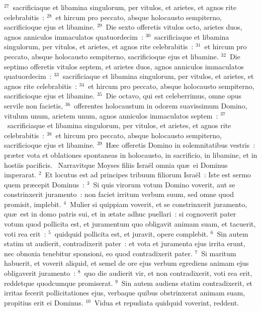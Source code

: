 ${}^{27}$~sacrificiaque et libamina singulorum, per vitulos, et arietes, et agnos rite celebrabitis~:
${}^{28}$~et hircum pro peccato, absque holocausto sempiterno, sacrificioque ejus et libamine.
${}^{29}$~Die sexto offeretis vitulos octo, arietes duos, agnos anniculos immaculatos quatuordecim~:
${}^{30}$~sacrificiaque et libamina singulorum, per vitulos, et arietes, et agnos rite celebrabitis~:
${}^{31}$~et hircum pro peccato, absque holocausto sempiterno, sacrificioque ejus et libamine.
${}^{32}$~Die septimo offeretis vitulos septem, et arietes duos, agnos anniculos immaculatos quatuordecim~:
${}^{33}$~sacrificiaque et libamina singulorum, per vitulos, et arietes, et agnos rite celebrabitis~:
${}^{34}$~et hircum pro peccato, absque holocausto sempiterno, sacrificioque ejus et libamine.
${}^{35}$~Die octavo, qui est celeberrimus, omne opus servile non facietis,
${}^{36}$~offerentes holocaustum in odorem suavissimum Domino, vitulum unum, arietem unum, agnos anniculos immaculatos septem~:
${}^{37}$~sacrificiaque et libamina singulorum, per vitulos, et arietes, et agnos rite celebrabitis~:
${}^{38}$~et hircum pro peccato, absque holocausto sempiterno, sacrificioque ejus et libamine.
${}^{39}$~H\ae c offeretis Domino in solemnitatibus vestris~: pr\ae ter vota et oblationes spontaneas in holocausto, in sacrificio, in libamine, et in hostiis pacificis.
~Narravitque Moyses filiis Isra\"el omnia qu\ae\ ei Dominus imperarat.
${}^{2}$~Et locutus est ad principes tribuum filiorum Isra\"el~: Iste est sermo quem pr\ae cepit Dominus~:
${}^{3}$~Si quis virorum votum Domino voverit, aut se constrinxerit juramento~: non faciet irritum verbum suum, sed omne quod promisit, implebit.
${}^{4}$~Mulier si quippiam voverit, et se constrinxerit juramento, qu\ae\ est in domo patris sui, et in \ae tate adhuc puellari~: si cognoverit pater votum quod pollicita est, et juramentum quo obligavit animam suam, et tacuerit, voti rea erit~:
${}^{5}$~quidquid pollicita est, et juravit, opere complebit.
${}^{6}$~Sin autem statim ut audierit, contradixerit pater~: et vota et juramenta ejus irrita erunt, nec obnoxia tenebitur sponsioni, eo quod contradixerit pater.
${}^{7}$~Si maritum habuerit, et voverit aliquid, et semel de ore ejus verbum egrediens animam ejus obligaverit juramento~:
${}^{8}$~quo die audierit vir, et non contradixerit, voti rea erit, reddetque quodcumque promiserat.
${}^{9}$~Sin autem audiens statim contradixerit, et irritas fecerit pollicitationes ejus, verbaque quibus obstrinxerat animam suam, propitius erit ei Dominus.
${}^{10}$~Vidua et repudiata quidquid voverint, reddent.

